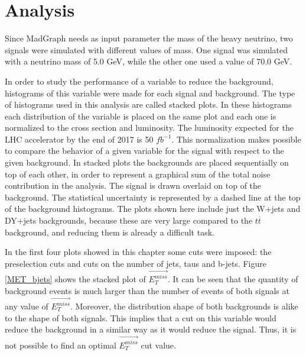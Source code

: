\chapter{Analysis}
\label{Analysis_chapter}

Since MadGraph needs as input parameter the mass of the heavy neutrino, two signals were simulated with different values of mass. One signal was simulated with a neutrino mass of 5.0 GeV, while the other one used a value of 70.0 GeV.

In order to study the performance of a variable to reduce the background, histograms of this variable were made for each signal and background. The type of histograms used in this analysis are called stacked plots. In these histograms each distribution of the variable is placed on the same plot and each one is normalized to the cross section and luminosity. The luminosity expected for the LHC accelerator by the end of 2017 is 50 $fb^{-1}$. This normalization makes possible to compare the behavior of a given variable for the signal with respect to the given background. In stacked plots the backgrounds are placed sequentially on top of each other, in order to represent a graphical sum of the total noise contribution in the analysis. The signal is drawn overlaid on top of the background. The statistical uncertainty is represented by a dashed line at the top of the background histograms. The plots shown here include just the W+jets and DY+jets backgrounds, because these are very large compared to the $t\overline{t}$ background, and reducing them is already a difficult task.

In the first four plots showed in this chapter some cuts were imposed: the preselection cuts and cuts on the number of jets, taus and b-jets. Figure \ref{MET_bjets} shows the stacked plot of $\vec{E_T^{miss}}$. It can be seen that the quantity of background events is much larger than the number of events of both signals at any value of $\vec{E_T^{miss}}$. Moreover, the distribution shape of both backgrounds is alike to the shape of both signals. This implies that a cut on this variable would reduce the background in a similar way as it would reduce the signal. Thus, it is not possible to find an optimal $\vec{E_T^{miss}}$ cut value.

